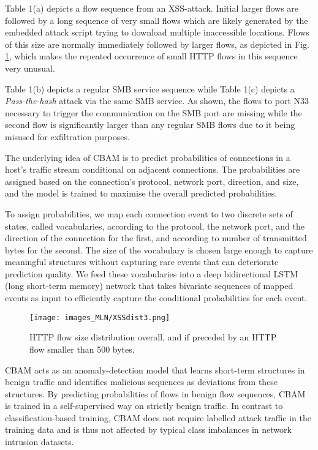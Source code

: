 Table 1(a) %
depicts a flow sequence from an XSS-attack. Initial larger flows are followed by a long sequence of very small flows which are likely generated by the embedded attack script  trying to download multiple inaccessible locations. Flows of this size are normally immediately followed by larger flows, as depicted in Fig. \ref{Fig:XSSdist}, which makes the repeated occurrence of small HTTP flows in this sequence very unusual. 



Table 1(b) %
depicts a regular SMB service sequence while Table 1(c) %
depicts a \textit{Pass-the-hash} attack via the same SMB service. As shown, the flows to port N33 necessary to trigger the communication on the SMB port are missing while the second flow is significantly larger than any regular SMB flows due to it being misused for exfiltration purposes.




The underlying idea of CBAM is to predict probabilities of connections in a host's traffic stream conditional on adjacent connections. The probabilities are assigned based on the connection's protocol, network port, direction, and size,  and the model is trained to maximise the overall predicted probabilities. 


To assign probabilities, we map each connection event to two discrete sets of states, called vocabularies, according to the protocol, the network port, and the direction of the connection for the first, and according to number of transmitted bytes for the second. The size of the vocabulary is chosen large enough to capture meaningful structures without capturing  rare events that can deteriorate prediction quality. We feed these vocabularies into a deep bidirectional LSTM (long short-term memory) network that takes bivariate sequences of mapped events as input to efficiently capture the conditional probabilities for each event. 
\begin{figure}
\centering
\texttt{[image: images\_MLN/XSSdist3.png]}
\caption{HTTP flow size distribution overall, and if preceded by an HTTP flow smaller than 500 bytes.}\label{Fig:XSSdist}
\end{figure}

CBAM acts as an anomaly-detection model that learns short-term structures in benign traffic and identifies malicious sequences as deviations from these structures. 
By predicting probabilities of flows in benign flow sequences, CBAM is trained in a self-supervised way  on strictly benign traffic. In contrast to classification-based training, CBAM does not require labelled attack traffic in the training data and is thus not affected by typical class imbalances in network intrusion datasets. 

